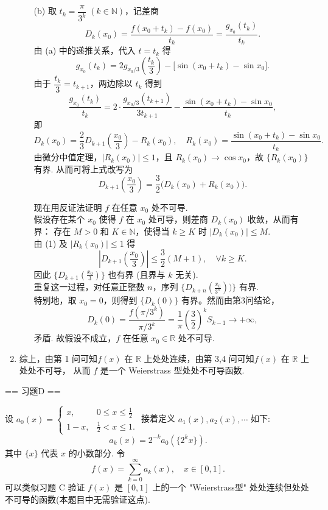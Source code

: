 \begin{solution}
\begin{enumerate}[leftmargin=*,label=\arabic*.]
\begin{enumerate}[leftmargin=*,label=(\alph*)]
    \item[(b)] 
    取 \(\displaystyle t_k=\dfrac{\pi}{3^k}\;(k\in\mathbb{N})\)，记差商
    \[
    D_k(x_0)=\frac{f(x_0+t_k)-f(x_0)}{t_k}=\frac{g_{x_0}(t_k)}{t_k}.
    \]
    由 (a) 中的递推关系，代入 \(t=t_k\) 得
    \[
    g_{x_0}(t_k)=2g_{x_0/3}\!\left(\frac{t_k}{3}\right)-\bigl[\sin(x_0+t_k)-\sin x_0\bigr].
    \]
    由于 \(\dfrac{t_k}{3}=t_{k+1}\)，两边除以 \(t_k\) 得到
    \[
    \frac{g_{x_0}(t_k)}{t_k}=2\cdot\frac{g_{x_0/3}(t_{k+1})}{3t_{k+1}}-\frac{\sin(x_0+t_k)-\sin x_0}{t_k},
    \]
    即
    \[
    D_k(x_0)=\frac{2}{3}D_{k+1}\!\left(\frac{x_0}{3}\right)-R_k(x_0),\quad 
    R_k(x_0)=\frac{\sin(x_0+t_k)-\sin x_0}{t_k}.
    \]
    由微分中值定理，\(|R_k(x_0)|\le 1\)，且 \(R_k(x_0)\to \cos x_0\)，故 \(\{R_k(x_0)\}\) 有界. 从而可将上式改写为
    \[
    D_{k+1}\!\left(\frac{x_0}{3}\right)=\frac{3}{2}\bigl(D_k(x_0)+R_k(x_0)\bigr). \tag{1}
    \]

    现在用反证法证明 \(f\) 在任意 \(x_0\) 处不可导.\\
    假设存在某个 \(x_0\) 使得 \(f\) 在 \(x_0\) 处可导，则差商 \(D_k(x_0)\) 收敛，从而有界：
    存在 \(M>0\) 和 \(K\in\mathbb{N}\)，使得当 \(k\ge K\) 时 \(|D_k(x_0)|\le M\).\\
    由 (1) 及 \(|R_k(x_0)|\le 1\) 得
    \[
    \left|D_{k+1}\!\left(\frac{x_0}{3}\right)\right|\le \frac{3}{2}(M+1),\quad \forall k\ge K.
    \]
    因此 \(\displaystyle \{D_{k+1}(\frac{x_0}{3})\}\) 也有界 (且界与 \(k\) 无关). \\
    重复这一过程，对任意正整数 \(n\)，序列 \(\displaystyle \{D_{k+n}(\frac{x_0}{3^n}))\}\) 有界.\\ 
    特别地，取 \(x_0=0\)，则得到 \(\{D_k(0)\}\) 有界。然而由第3问结论，
    \[
    D_k(0)=\frac{f(\pi/3^k)}{\pi/3^k}=\frac{1}{\pi}\left(\frac{3}{2}\right)^k S_{k-1}\to +\infty,
    \]
    矛盾. 故假设不成立，\(f\) 在任意 \(x_0\in\mathbb{R}\) 处不可导.
    \end{enumerate}

    \item 
    综上，由第 1 问可知\( f(x) \) 在 \(\mathbb{R}\) 上处处连续，由第 3,4 问可知\( f(x) \) 在 \(\mathbb{R}\) 上处处不可导，
    从而 $f$ 是一个 Weierstrass 型处处不可导函数. 
    \end{enumerate}
\end{solution}

== 习题D ==

设 
\(\displaystyle a_0(x) = 
\left\{ 
    \begin{array}{ll}
        x, & \displaystyle 0 \leq x \leq \frac{1}{2} \\ 
        1 - x, & \displaystyle \frac{1}{2} < x \leq 1.
    \end{array} 
\right.\) 
接着定义 \(a_1(x), a_2(x), \cdots\) 如下:
\[\displaystyle a_k(x) = 2^{-k} a_0(\{2^k x\}).\]
其中 \(\{x\}\) 代表 \(x\) 的小数部分. 令
\[\displaystyle f(x) = \sum_{k = 0}^{\infty} a_k(x), \quad x \in [0, 1].\]
可以类似习题 C 验证 \(f(x)\) 是 \([0, 1]\) 上的一个 "Weierstrass型" 处处连续但处处不可导的函数(本题目中无需验证这点).

